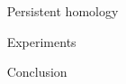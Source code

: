 \documentclass{beamer}
\begin{document}
\begin{frame}{}
\begin{columns}[t]
\begin{column}{0.32\linewidth}
\end{column}%

\begin{column}{0.32\linewidth}

\begin{block}{Persistent homology}

\end{block}

\begin{block}{Experiments}

\end{block}

\begin{block}{Conclusion}

\end{block}

\end{column}%

\end{columns}
\end{frame}
\end{document}
